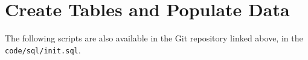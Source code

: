 \section{Create Tables and Populate Data}

The following scripts are also available in the Git repository linked above,
in the \texttt{code/sql/init.sql}.

\inputminted{sql}{../code/sql/init.sql}
